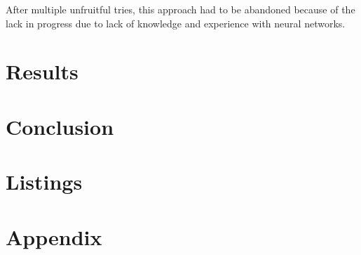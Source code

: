 \documentclass[titlepage,12pt]{article}
\begin{document}
After multiple unfruitful tries, this approach had to be abandoned because of the lack in progress due to lack of knowledge and experience with neural networks.

\pagebreak
\section{Results}\label{s:results}

\pagebreak
\section{Conclusion}\label{s:conclusion}

\pagebreak
\section{Listings}\label{s:listings}
\label{bib}
\newpage
\listoffigures\label{sec:ListOfFigures}
\newpage
\listoftables\label{sec:ListOfTables}
\newpage
\lstlistoflistings\label{sec:ListOfListings}

\pagebreak
\appendix
\section{Appendix}\label{s:appendix}
\end{document}
